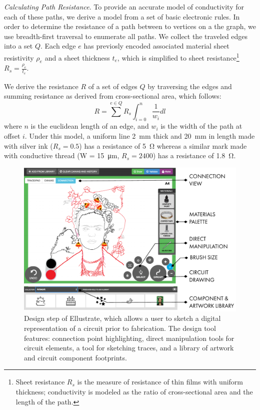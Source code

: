 \documentclass{sigchi}
\begin{document}
      
    \textit{Calculating Path Resistance}. To provide an accurate model of conductivity for each of these paths, we derive a model from a set of basic electronic rules. In order to determine the resistance of a path between to vertices on a the graph, we use breadth-first traversal to enumerate all paths.
    We collect the traveled edges into a set $Q$. 
    Each edge $e$ has previosly encoded associated material sheet resistivity $\rho_e$ and a sheet thickness $t_e$, which is simplified to sheet resistance\footnote{Sheet resistance $R_s$ is the measure of resistance of thin films with uniform thickness; conductivity is modeled as the ratio of cross-sectional area and the length of the path.} $R_s = \frac{\rho_e}{t_e}$.
    
    We derive the resistance $R$ of a set of edges $Q$ by traversing the edges and summing resistance as derived from cross-sectional area, which follows:
        \begin{equation}
            R =  \sum^{e \in Q} R_s \int_{i=0}^{n}  \frac{1}{w_i} dl
        \label{eq:resistance}
        \end{equation}
      where $n$ is the euclidean length of an edge, and $w_i$ is the width of the path at offset $i$. Under this model, a uniform line \SI{2}{\milli\metre} thick and \SI{20}{\milli\metre} in length made with silver ink ($R_s = 0.5$) has a resistance of \SI{5}{\ohm} whereas a similar mark made with conductive thread (W = \SI{15}{\micro\metre}, $R_s = 2400$) has a resistance of \SI{1.8}{\ohm}.

    \begin{figure}[t]
    \centering
    \includegraphics[width=1.0\columnwidth]{figures/designtool.pdf}
    \caption{Design step of Ellustrate, which allows a user to sketch a digital representation of a circuit prior to fabrication. The design tool features: connection point highlighting, direct manipulation tools for circuit elements, a tool for sketching traces, and a library of artwork and circuit component footprints.}
    \label{fig:design_tool}
    \vspace{-16pt}
    \end{figure}
    
\end{document}

